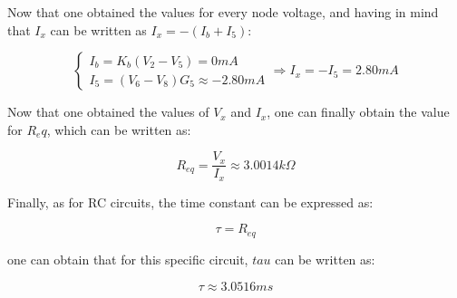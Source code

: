 Now that one obtained the values for every node voltage, and having in mind that $I_x$ can be written as $I_x = -(I_b+I_5)$:

\begin{equation}
\begin{cases}
    I_b = K_b(V_2 - V_5) = 0mA\\
    I_5 = (V_6 - V_8)G_5 \approx -2.80 mA
\end{cases}
    \Longrightarrow I_x = -I_5 = 2.80 mA
\end{equation}

Now that one obtained the values of $V_x$ and $I_x$, one can finally obtain the value for $R_eq$, which can be written as:

\begin{equation}
    R_{eq} = \frac{V_x}{I_x} \approx 3.0014 k\Omega
\end{equation}

Finally, as for RC circuits, the time constant can be expressed as:

\begin{equation}
    \tau = R_{eq}
\end{equation}

one can obtain that for this specific circuit, $tau$ can be written as:

\begin{equation}
    \tau \approx 3.0516 ms
\end{equation}